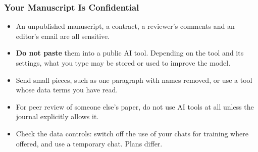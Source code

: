 
\begin{frame}[fragile]\frametitle{Your Manuscript Is Confidential}
\begin{itemize}
\item An unpublished manuscript, a contract, a reviewer's comments and an editor's email are all sensitive.
\item \textbf{Do not paste} them into a public AI tool. Depending on the tool and its settings, what you type may be stored or used to improve the model.
\item Send small pieces, such as one paragraph with names removed, or use a tool whose data terms you have read.
\item For peer review of someone else's paper, do not use AI tools at all unless the journal explicitly allows it.
\item Check the data controls: switch off the use of your chats for training where offered, and use a temporary chat. Plans differ.
\end{itemize}
\end{frame}


